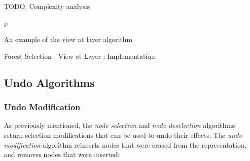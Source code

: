 TODO: Complexity analysis

\begin{stusubfig}{p}
	\hspace{4mm}%
\caption{An example of the view at layer algorithm}
\label{fig:ipfs-selection-viewatlayer}
\end{stusubfig}

\begin{stulisting}[p]
\caption{Forest Selection : View at Layer : Implementation}
\label{code:ipfs-selection-viewatlayer}

\end{stulisting}

\afterpage{\clearpage}
\newpage

\subsection{Undo Algorithms}

\subsubsection{Undo Modification}

As previously mentioned, the \emph{node selection} and \emph{node deselection} algorithms return selection modifications that can be used to undo their effects. The \emph{undo modification} algorithm reinserts nodes that were erased from the representation, and removes nodes that were inserted:

